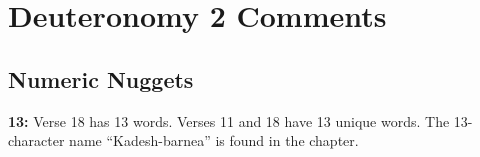 \section{Deuteronomy 2 Comments}

\subsection{Numeric Nuggets}
\textbf{13: } Verse 18 has 13 words.  Verses 11 and 18 have 13 unique words.  The 13-character name ``Kadesh-barnea'' is found in the chapter.